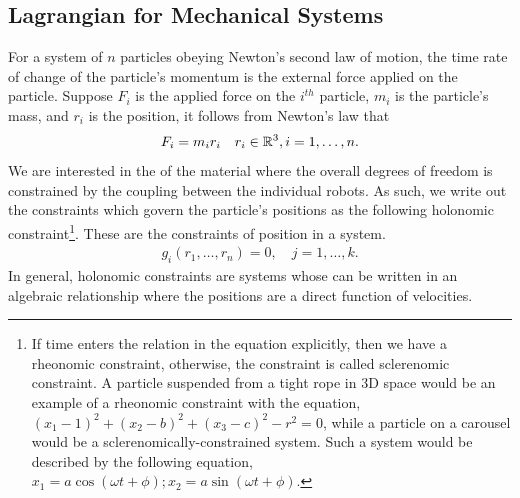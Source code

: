 \subsection{Lagrangian for Mechanical Systems }
%
For a system of $n$ particles obeying Newton's second law of motion, the time rate of change of the particle's momentum is the external force applied on the particle. Suppose $F_i$ is the applied force on the $i^{th}$ particle, $m_i$ is the particle's mass, and $r_i$ is the position, it follows from Newton's law that 
%
\begin{align}
	F_i = m_i r_i \quad r_i \in \mathbb{R}^3, i = 1, \ldots, n.
	\label{eq:RBD_Newton}
\end{align}
%
We are interested in the  of the material where the overall degrees of freedom is constrained by the coupling between the individual robots. As such, we write out the constraints which govern the particle's positions as the following holonomic constraint\footnote{
%
If time enters the relation in the equation explicitly, then we have a rheonomic constraint, otherwise, the constraint is called sclerenomic constraint. A particle suspended from a tight rope in 3D space would be an example of a rheonomic constraint with the equation, $(x_1-1)^2  + (x_2 - b)^2 + (x_3-c)^2 - r^2 = 0$, while a particle on a carousel would be a sclerenomically-constrained system. Such a system would be described by the following equation, $x_1 = a \cos(\omega t + \phi); x_2 = a \sin (\omega t + \phi).$}. These are the constraints of position in a system.  
%
\begin{align}
g_i(r_1, \ldots, r_n) = 0, \quad j = 1, \ldots, k.
\label{eq:holonomic}
\end{align} 
%
In general, holonomic constraints are systems whose \dofs can be written in an algebraic relationship where the positions are a direct function of velocities. 

